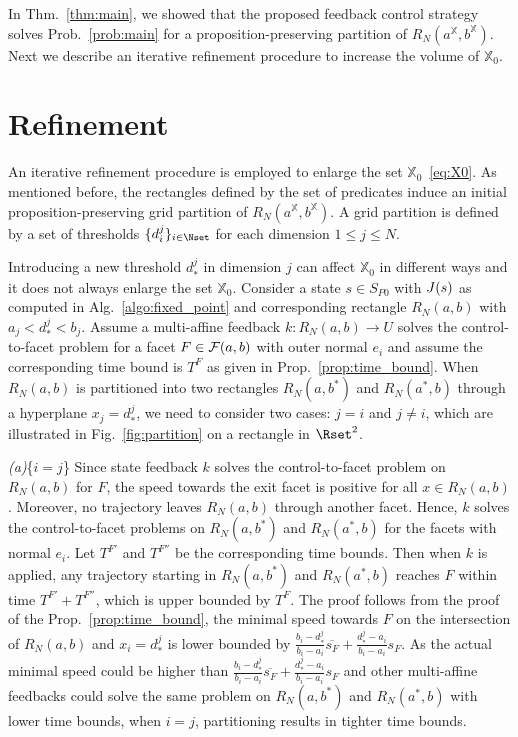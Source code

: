 \documentclass{ifacconf}
\newcommand{\FNab}{{\cal F}(a,b)}
\newcommand{\RNset}{R_N(a^{\mathbb{X}},b^{\mathbb{X}})}
\newcommand{\RNab}{R_N(a,b)}
\newcommand{\XO}{\ensuremath{\mathbb{X}_0}}
\begin{document}
In Thm.~\ref{thm:main}, we showed that the proposed feedback control strategy solves Prob.~\ref{prob:main} for a proposition-preserving partition of $\RNset$.  Next we describe an iterative refinement procedure to increase the volume of $\XO$.




\section{Refinement}\label{sec:optimization}
 \newcommand{\OPTVAR}{d_{i*}^{j}}
 \newcommand{\OPTVARS}{d_{i}^{j}}
 \newcommand{\OPTVARN}{d_{i+1}^{j}}
\newcommand{\NEWTH}{d^j_*}

An iterative refinement procedure is employed to enlarge the set $\XO$~\eqref{eq:X0}. 
As mentioned before, the rectangles defined by the set of predicates induce an initial proposition-preserving grid partition of $\RNset$. A grid partition is defined by a set of thresholds $\{d_i^j\}_{i \in \Nset}$ for each dimension $1\leq j \leq N$. 



 Introducing a new threshold $\NEWTH$ in dimension $j$ can affect $\XO$ in different ways and it does not always enlarge the set $\XO$.  Consider a state $s \in S_{P0}$ with $J(s)$ as computed in Alg.~\ref{algo:fixed_point} and corresponding rectangle $\RNab$ with ${a}_j < \NEWTH < {b}_j$.  Assume a multi-affine feedback $k: \RNab
\longrightarrow U$ solves the control-to-facet problem for a facet $F \in \FNab$ with outer normal $e_i$ and assume the corresponding time bound is $T^F$ as given in Prop.~\ref{prop:time_bound}. When $\RNab$ is partitioned into two rectangles $R_N(a , b^*)$ and $R_N(a^* , b)$ through a hyperplane $x_j = d^j_*$,  we need to consider two cases: $j=i$ and $j\neq i$, which are illustrated in Fig.~\ref{fig:partition} on a rectangle in $\Rset^2$.


  \emph{(a)}\{{\it $i=j$}\} Since state feedback $k$ solves the control-to-facet problem on $\RNab$ for $F$, the speed towards the exit facet is positive for all $x \in \RNab$. Moreover, no trajectory leaves $\RNab$ through another facet. Hence, $k$ solves the control-to-facet problems on $R_N(a,b^*)$ and $R_N(a^*,b)$ for the facets with normal $e_i$. Let $T^{F'}$ and $T^{F''}$ be the corresponding time bounds. Then when $k$ is applied, any trajectory starting in $R_N(a,b^*)$ and $R_N(a^*,b)$ reaches $F$ within time $T^{F'} + T^{F''}$, which is upper bounded by $T^F$. The proof follows from the proof of the Prop.~\ref{prop:time_bound}, the minimal speed towards $F$ on the intersection of $\RNab$ and $x_i = \NEWTH$ is lower bounded by $\frac{b_i - \NEWTH}{b_i - a_i}\overline{s_{F}} + \frac{\NEWTH - a_i}{b_i - a_i}s_{F}$. As the actual minimal speed could be higher than $\frac{b_i - \NEWTH}{b_i - a_i}\overline{s_{F}} + \frac{\NEWTH - a_i}{b_i - a_i}s_{F}$ and other multi-affine feedbacks could solve the same problem on $R_N(a,b^*)$ and $R_N(a^*,b)$ with lower time bounds, when $i=j$, partitioning results in tighter time bounds.
  
\end{document}
